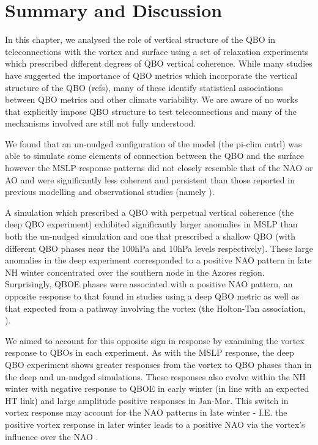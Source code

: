 \section{Summary and Discussion}

In this chapter, we analysed the role of vertical structure of the QBO in teleconnections with the vortex and surface using a set of relaxation experiments which prescribed different degrees of QBO vertical coherence. While many studies have suggested the importance of QBO metrics which incorporate the vertical structure of the QBO (refs), many of these identify statistical associations between QBO metrics and other climate variability. We are aware of no works that explicitly impose QBO structure to test teleconnections and many of the mechanisms involved are still not fully understood. 

We found that an un-nudged configuration of the model (the pi-clim cntrl) was able to simulate some elements of connection between the QBO and the surface however the MSLP response patterns did not closely resemble that of the NAO or AO and were significantly less coherent and persistent than those reported in previous modelling and observational studies (namely \cite{Andrews2020}).

A simulation which prescribed a QBO with perpetual vertical coherence (the deep QBO experiment) exhibited significantly larger anomalies in MSLP than both the un-nudged simulation and one that prescribed a shallow QBO (with different QBO phases near the 100hPa and 10hPa levels respectively). These large anomalies in the deep experiment corresponded to a positive NAO pattern in late NH winter concentrated over the southern node in the Azores region. Surprisingly, QBOE phases were associated with a positive NAO pattern, an opposite response to that found in studies using a deep QBO metric \citep{Andrews2020} as well as that expected from a pathway involving the vortex (the Holton-Tan association, \cite{holtonNumerical1980}).

We aimed to account for this opposite sign in response by examining the vortex response to QBOs in each experiment. As with the MSLP response, the deep QBO experiment shows greater responses from the vortex to QBO phases than in the deep and un-nudged simulations. These responses also evolve within the NH winter with negative response to QBOE in early winter (in line with an expected HT link) and large amplitude positive responses in Jan-Mar. This switch in vortex response may account for the NAO patterns in late winter - I.E. the positive vortex response in later winter leads to a positive NAO via the vortex's influence over the NAO \citep{charlton-perezInfluence2018e}. 

